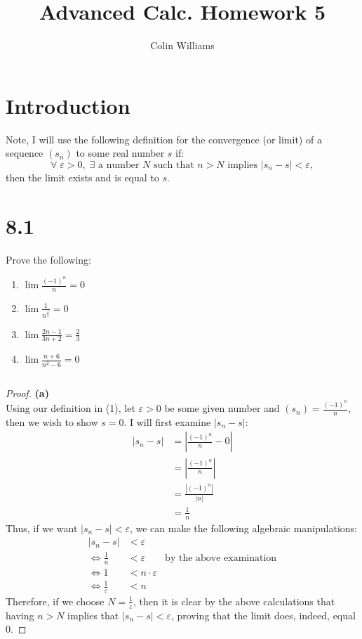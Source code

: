 \documentclass[10pt,a4paper]{article}
\title{Advanced Calc. Homework 5}
\author{Colin Williams}
\theoremstyle{definition}
\begin{document}
\maketitle

\section*{Introduction}
Note, I will use the following definition for the convergence (or limit) of a sequence $(s_n)$ to some real number $s$ if:
\begin{equation}
\forall \; \varepsilon > 0, \; \exists \text{ a number } N \text{ such that } n > N \text{ implies } |s_n - s| < \varepsilon,
\end{equation}
then the limit exists and is equal to $s$.

\section*{8.1}
Prove the following:
\begin{enumerate}[label = (\alph*)]
\item $\lim \frac{\displaystyle (-1)^n}{\displaystyle n} = 0$
\item $\lim \frac{\displaystyle 1}{\displaystyle n^{\frac{1}{3}}} = 0$
\item $\lim \frac{2n - 1}{3n + 2} = \frac{2}{3}$
\item $\lim \frac{n + 6}{n^2 - 6} = 0$
\end{enumerate}
$ $
\begin{proof}{\textbf{(a)}}
\\Using our definition in (1), let $\varepsilon > 0$ be some given number and $\displaystyle (s_n) = \frac{(-1)^n}{n}$, then we wish to show $s = 0$. I will first examine $|s_n - s|$:
\begin{align*}
|s_n - s| &= \left|\frac{(-1)^n}{n} - 0\right|\\
&= \left|\frac{(-1)^n}{n}\right|\\
&= \frac{|(-1)^n|}{|n|}\\
&= \frac{1}{n}
\end{align*}
Thus, if we want $|s_n - s| < \varepsilon$, we can make the following algebraic manipulations:
\begin{align*}
|s_n - s| &< \varepsilon\\
\iff \frac{1}{n} &< \varepsilon &\text{by the above examination}\\
\iff 1 &< n\cdot \varepsilon\\
\iff \frac{1}{\varepsilon} &< n
\end{align*}
Therefore, if we choose $\displaystyle N = \frac{1}{\varepsilon}$, then it is clear by the above calculations that having $n > N$ implies that $|s_n - s| < \varepsilon$, proving that the limit does, indeed, equal $0$.
\end{proof}
\end{document}
